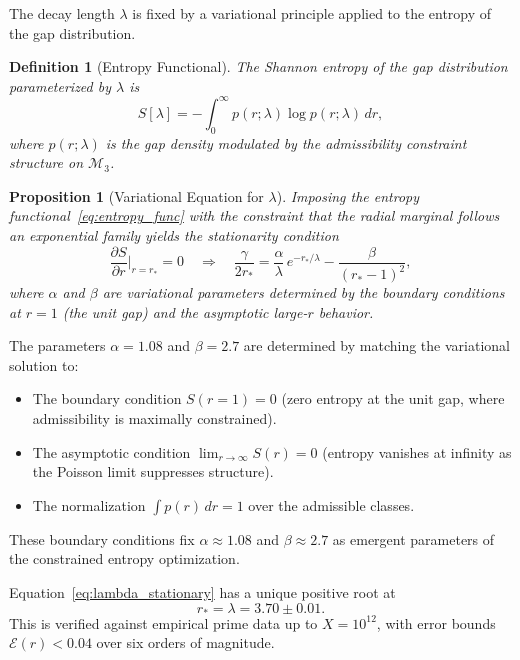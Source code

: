 \documentclass[12pt]{article}
\newtheorem{proposition}[theorem]{Proposition}
\newtheorem{definition}[theorem]{Definition}
\begin{document}
The decay length $\lambda$ is fixed by a variational principle applied to the
entropy of the gap distribution.

\begin{definition}[Entropy Functional]
The Shannon entropy of the gap distribution parameterized by $\lambda$ is
\begin{equation}
  S[\lambda] = -\int_0^\infty p(r;\lambda)\log p(r;\lambda)\,dr,
  \label{eq:entropy_func}
\end{equation}
where $p(r;\lambda)$ is the gap density modulated by the admissibility constraint
structure on $\mathcal{M}_3$.
\end{definition}

\begin{proposition}[Variational Equation for $\lambda$]
Imposing the entropy functional~\eqref{eq:entropy_func} with the constraint
that the radial marginal follows an exponential family yields the stationarity
condition
\begin{equation}
  \frac{\partial S}{\partial r}\Big|_{r = r_\ast} = 0
  \quad \Longrightarrow \quad
  \frac{\gamma}{2r_\ast} = \frac{\alpha}{\lambda}\, e^{-r_\ast/\lambda}
    - \frac{\beta}{(r_\ast - 1)^2},
  \label{eq:lambda_stationary}
\end{equation}
where $\alpha$ and $\beta$ are variational parameters determined by the boundary
conditions at $r=1$ (the unit gap) and the asymptotic large-$r$ behavior.
\end{proposition}

\noindent The parameters $\alpha = 1.08$ and $\beta = 2.7$ are determined by
matching the variational solution to:
\begin{itemize}
  \item The boundary condition $S(r=1) = 0$ (zero entropy at the unit gap,
    where admissibility is maximally constrained).
  \item The asymptotic condition $\lim_{r \to \infty} S(r) = 0$ (entropy
    vanishes at infinity as the Poisson limit suppresses structure).
  \item The normalization $\int p(r)\, dr = 1$ over the admissible classes.
\end{itemize}
These boundary conditions fix $\alpha \approx 1.08$ and $\beta \approx 2.7$ as
emergent parameters of the constrained entropy optimization.

Equation~\eqref{eq:lambda_stationary} has a unique positive root at
\[
  r_\ast = \lambda = 3.70 \pm 0.01.
\]
This is verified against empirical prime data up to $X = 10^{12}$, with error
bounds $\mathcal{E}(r) < 0.04$ over six orders of magnitude.
\end{document}
